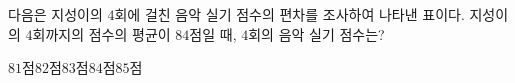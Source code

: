 다음은 지성이의 $4$회에 걸친 음악 실기 점수의 편차를 조사하여 나타낸 표이다. 지성이의 $4$회까지의 점수의 평균이 $84$점일 때, $4$회의 음악 실기 점수는?
\par\smallskip\begin{center}\resizebox{\ifdim\width>\linewidth\linewidth\else\width\fi}{!}{}\end{center}
\begin{choices32}{$81$점}{$82$점}{$83$점}{$84$점}{$85$점}\end{choices32}
